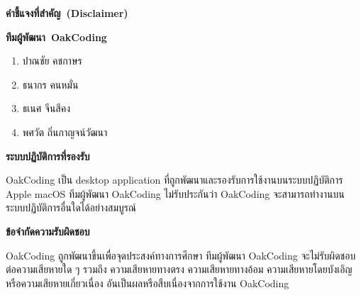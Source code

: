\begin{titlepage}
\maketitle
\thispagestyle{empty}
\vspace{1ex}


\mbox{\LARGE \textbf{คำชี้แจงที่สำคัญ (Disclaimer)}}

\rule{0em}{2.6ex}

\mbox{\large \textbf{ทีมผู้พัฒนา OakCoding}}

\begin{enumerate}[topsep = 0pt, itemsep = 0.6pt]
    \item ปาณชัย คชกาษร
    \item ธนากร คนหมั่น
    \item ธเนศ จีนสีคง
    \item พศวัต ถิ่นกาญจน์วัฒนา
\end{enumerate}

\rule{0em}{2.6ex}

\mbox{\large \textbf{ระบบปฏิบัติการที่รองรับ}}

OakCoding เป็น desktop application ที่ถูกพัฒนาและรองรับการใช้งานบนระบบปฏิบัติการ Apple macOS
ทีมผู้พัฒนา OakCoding ไม่รับประกันว่า OakCoding จะสามารถทำงานบนระบบปฏิบัติการอื่นใดได้อย่างสมบูรณ์

\rule{0em}{2.6ex}

\mbox{\large \textbf{ข้อจำกัดความรับผิดชอบ}}

OakCoding ถูกพัฒนาขึ้นเพื่อจุดประสงค์ทางการศึกษา
ทีมผู้พัฒนา OakCoding จะไม่รับผิดชอบต่อความเสียหายใด ๆ รวมถึง ความเสียหายทางตรง
ความเสียหายทางอ้อม ความเสียหายโดยบังเอิญ หรือความเสียหายเกี่ยวเนื่อง อันเป็นผลหรือสืบเนื่องจากการใช้งาน OakCoding
\end{titlepage}
